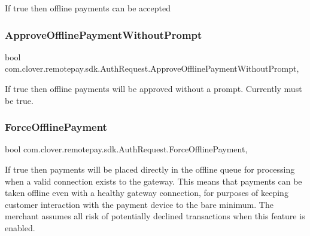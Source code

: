 If true then offline payments can be accepted 

\mbox{\label{classcom_1_1clover_1_1remotepay_1_1sdk_1_1_auth_request_aa1e83e887f5d3db97e7ae9810bb63e08}} 
\subsubsection{\texorpdfstring{Approve\+Offline\+Payment\+Without\+Prompt}{ApproveOfflinePaymentWithoutPrompt}}
{\footnotesize\ttfamily bool com.\+clover.\+remotepay.\+sdk.\+Auth\+Request.\+Approve\+Offline\+Payment\+Without\+Prompt\hspace{0.3cm}{\ttfamily [get]}, {\ttfamily [set]}}



If true then offline payments will be approved without a prompt. Currently must be true. 

\mbox{\label{classcom_1_1clover_1_1remotepay_1_1sdk_1_1_auth_request_ae60bb0644551b7c845472bfcef226de4}} 
\subsubsection{\texorpdfstring{Force\+Offline\+Payment}{ForceOfflinePayment}}
{\footnotesize\ttfamily bool com.\+clover.\+remotepay.\+sdk.\+Auth\+Request.\+Force\+Offline\+Payment\hspace{0.3cm}{\ttfamily [get]}, {\ttfamily [set]}}



If true then payments will be placed directly in the offline queue for processing when a valid connection exists to the gateway. This means that payments can be taken offline even with a healthy gateway connection, for purposes of keeping customer interaction with the payment device to the bare minimum. The merchant assumes all risk of potentially declined transactions when this feature is enabled. 

